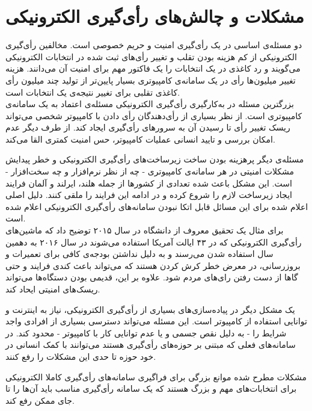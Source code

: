 \section{مشکلات و چالش‌های رأی‌گیری الکترونیکی}
\par
دو مسئله‌ی اساسی در یک رأی‌گیری امنیت و حریم خصوصی است. مخالفین رأی‌گیری الکترونیکی از کم هزینه بودن تقلب و تغییر رأی‌های ثبت شده در انتخابات الکترونیکی می‌گویند و رد کاغذی در یک انتخابات را یک فاکتور مهم برای امنیت آن می‌دانند. هزینه تغییر میلیون‌ها رأی در یک سامانه‌ی کامپیوتری بسیار پایین‌تر از تولید چند میلیون رأی کاغذی تقلبی برای تغییر نتیجه‌ی یک انتخابات است.
\\
بزرگترین مسئله در به‌کارگیری رأی‌گیری الکترونیکی مسئله‌ی اعتماد به یک سامانه‌ی‌ کامپیوتری است. از نظر بسیاری از رأی‌دهندگان رأی دادن با کامپیوتر شخصی می‌تواند ریسک تغییر رأی تا رسیدن آن به سرور‌های رأی‌گیری ایجاد کند. از طرف دیگر عدم امکان بررسی و تایید انسانی عملیات کامپیوتر، حس امنیت کمتری القا می‌کند.
\par
مسئله‌ی دیگر پرهزینه بودن ساخت زیرساخت‌های رأی‌گیری الکترونیکی و خطر پیدایش مشکلات امنیتی در هر سامانه‌ی کامپیوتری - چه از نظر نرم‌افزار و چه سخت‌افزار - است. این مشکل باعث شده تعدادی از کشور‌ها از جمله هلند، ایرلند و آلمان فرایند ایجاد زیرساخت لازم را شروع کرده و در ادامه این فرایند را ملقی کنند. دلیل اصلی اعلام شده برای این مسائل‌ قابل اتکا نبودن سامانه‌های رأی‌گیری الکترونیکی اعلام شده است. 
\\
برای مثال یک تحقیق معروف از دانشگاه‌  در سال ۲۰۱۵ 
توضیح داد که ماشین‌های رأی‌گیری الکترونیکی که در ۴۳ ایالت آمریکا استفاده می‌شوند در سال ۲۰۱۶ به دهمین سال استفاده شدن می‌رسند و به دلیل نداشتن بودجه‌ی کافی برای تعمیرات و بروزرسانی، در معرض خطر کرش
 کردن هستند که می‌تواند باعث کندی فرایند و حتی گاها از دست رفتن را‌ی‌های مردم شود. علاوه بر این، قدیمی بودن دستگاه‌ها می‌تواند ریسک‌های امنیتی ایحاد کند. 

\par
یک مشکل دیگر در پیاده‌سازی‌های بسیاری از رأی‌گیری الکترونیکی، نیاز به اینترنت و توانایی استفاده از کامپیوتر است. این مسئله می‌تواند دسترسی بسیاری از افرادی واجد شرایط را - به دلیل نقص جسمی و یا عدم توانایی کار با کامپیوتر - محدود کند. در سامانه‌های فعلی که مبتنی بر حوزه‌های رأی‌گیری هستند می‌توانند با کمک انسانی در خود حوزه تا حدی این مشکلات را رفع کنند. 
\par
مشکلات مطرح‌ شده موانع بزرگی برای فراگیری سامانه‌های رأی‌گیری کاملا الکترونیکی برای انتخابات‌های مهم و بزرگ هستند که یک سامانه رأی‌گیری مناسب باید آن‌ها را تا جای ممکن رفع کند. 

